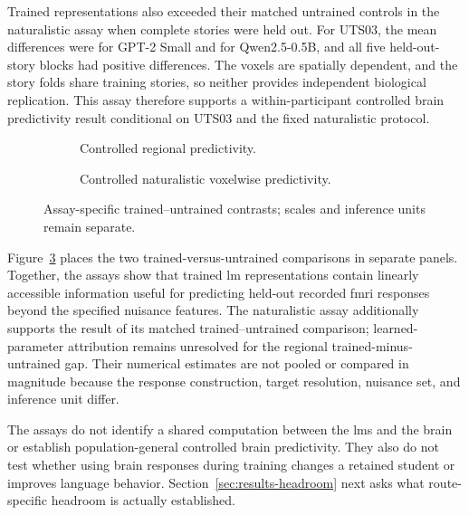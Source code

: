 Trained representations also exceeded their matched untrained controls in the naturalistic assay when complete stories were held out.
For UTS03, the mean differences were  for GPT-2 Small and  for Qwen2.5-0.5B, and all five held-out-story blocks had positive differences.
The voxels are spatially dependent, and the story folds share training stories, so neither provides independent biological replication.
This assay therefore supports a within-participant controlled brain predictivity result conditional on UTS03 and the fixed naturalistic protocol.

\begin{figure}[H]
  \centering
  \begin{subfigure}[t]{.495\textwidth}
    \centering
    \resizebox{\linewidth}{!}{}
    \caption{Controlled regional predictivity.}
    \label{fig:controlled-predictivity-regional}
  \end{subfigure}\hfill
  \begin{subfigure}[t]{.495\textwidth}
    \centering
    \resizebox{\linewidth}{!}{}
    \caption{Controlled naturalistic voxelwise predictivity.}
    \label{fig:controlled-predictivity-naturalistic}
  \end{subfigure}
  \caption{Assay-specific trained--untrained contrasts; scales and inference units remain separate.}
  \label{fig:controlled-predictivity-results}
\end{figure}
\FloatBarrier

Figure~\ref{fig:controlled-predictivity-results} places the two trained-versus-untrained comparisons in separate panels.
Together, the assays show that trained \ac{lm} representations contain linearly accessible information useful for predicting held-out recorded \ac{fmri} responses beyond the specified nuisance features.
The naturalistic assay additionally supports the result of its matched trained--untrained comparison; learned-parameter attribution remains unresolved for the regional trained-minus-untrained gap.
Their numerical estimates are not pooled or compared in magnitude because the response construction, target resolution, nuisance set, and inference unit differ.

The assays do not identify a shared computation between the \acp{lm} and the brain or establish population-general controlled brain predictivity.
They also do not test whether using brain responses during training changes a retained student or improves language behavior.
Section~\ref{sec:results-headroom} next asks what route-specific headroom is actually established.


